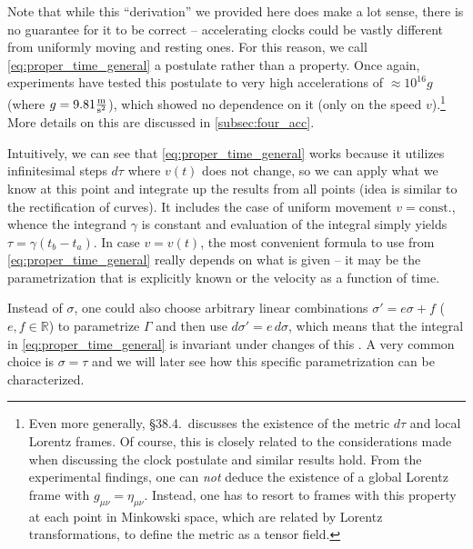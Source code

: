 \documentclass[../relativity_main.tex]{subfiles}
\begin{document}
Note that while this \enquote{derivation} we provided here does make a lot sense, there is no guarantee for it to be correct -- accelerating clocks could be vastly different from uniformly moving and resting ones. For this reason, we call \eqref{eq:proper_time_general} a postulate rather than a property. Once again, experiments have tested this postulate to very high accelerations of $\approx 10^{16} g$ (where $g = 9.81 \frac{\metre}{\second^2}$), which showed no dependence on it (only on the speed $v$).\footnote{Even more generally, \cite{Misner_1973} §38.4.~discusses the existence of the metric $d\tau$ and local Lorentz frames. Of course, this is closely related to the considerations made when discussing the clock postulate and similar results hold. From the experimental findings, one can \emph{not} deduce the existence of a global Lorentz frame with $g_{\mu \nu} = \eta_{\mu \nu}$. Instead, one has to resort to frames with this property at each point in Minkowski space, which are related by Lorentz transformations, to define the metric as a tensor field.} More details on this are discussed in \ref{subsec:four_acc}.




Intuitively, we can see that \eqref{eq:proper_time_general} works because it utilizes infinitesimal steps $d\tau$ where $v(t)$ does not change, so we can apply what we know at this point and integrate up the results from all points (idea is similar to the rectification of curves). It includes the case of uniform movement $v = \text{const.}$, whence the integrand $\gamma$ is constant and evaluation of the integral simply yields $\tau = \gamma (t_b - t_a)$. In case $v = v(t)$, the most convenient formula to use from \eqref{eq:proper_time_general} really depends on what is given -- it may be the parametrization that is explicitly known or the velocity as a function of time.

Instead of $\sigma$, one could also choose arbitrary linear combinations $\sigma' = e \sigma + f$ ($e, f \in \mathbb{R}$) to parametrize $\Gamma$ and then use $d\sigma' = e \, d\sigma$, which means that the integral in \eqref{eq:proper_time_general} is invariant under changes of this . A very common choice is $\sigma = \tau$ and we will later see how this specific parametrization can be characterized.\\
\end{document}
